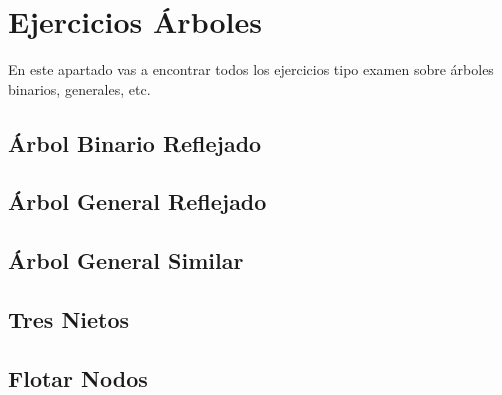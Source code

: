 \chapter{Ejercicios Árboles}
En este apartado vas a encontrar todos los ejercicios tipo examen sobre árboles binarios, generales, etc.


\section*{Árbol Binario Reflejado}
{}
\label{sec:EjercicioÁrboles1}


\newpage
\section*{Árbol General Reflejado}
{}
\label{sec:EjercicioÁrboles2}


\newpage
\section*{Árbol General Similar}
{}
\label{sec:EjercicioÁrboles3}


\newpage
\section*{Tres Nietos}
{}
\label{sec:EjercicioÁrboles4}


\newpage
\section*{Flotar Nodos}
{}
\label{sec:EjercicioÁrboles5}


